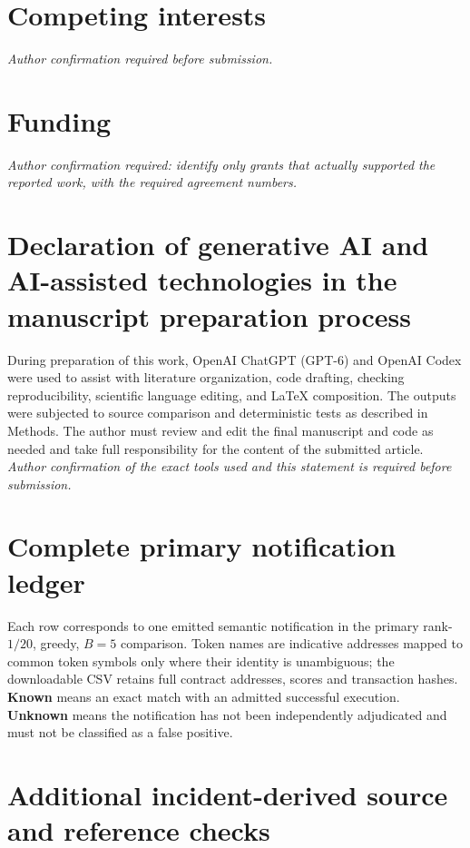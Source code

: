 \documentclass[preprint,12pt,authoryear]{elsarticle}
\begin{document}
\section*{Competing interests}
\textit{Author confirmation required before submission.}
\section*{Funding}
\textit{Author confirmation required: identify only grants that actually supported the reported work, with the required agreement numbers.}
\section*{Declaration of generative AI and AI-assisted technologies in the manuscript preparation process}
During preparation of this work, OpenAI ChatGPT (GPT-6) and OpenAI Codex were used to assist with literature organization, code drafting, checking reproducibility, scientific language editing, and LaTeX composition. The outputs were subjected to source comparison and deterministic tests as described in Methods. The author must review and edit the final manuscript and code as needed and take full responsibility for the content of the submitted article. \textit{Author confirmation of the exact tools used and this statement is required before submission.}

\appendix
\section{Complete primary notification ledger}\label{app:alerts}
Each row corresponds to one emitted semantic notification in the primary rank-$1/20$, greedy, $B=5$ comparison. Token names are indicative addresses mapped to common token symbols only where their identity is unambiguous; the downloadable CSV retains full contract addresses, scores and transaction hashes. \textbf{Known} means an exact match with an admitted successful execution. \textbf{Unknown} means the notification has not been independently adjudicated and must not be classified as a false positive.



\section{Additional incident-derived source and reference checks}\label{app:sourcecensus}

\end{document}
